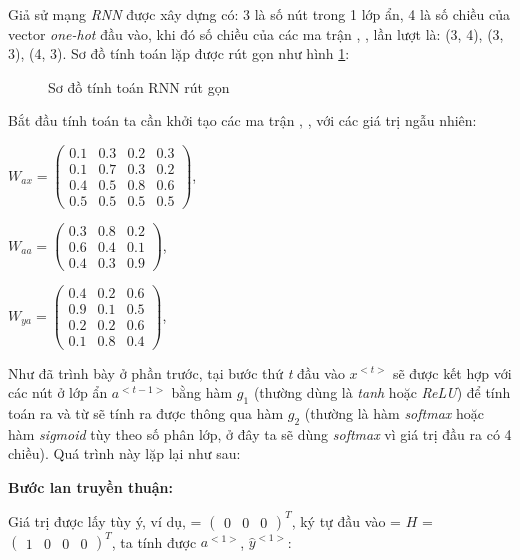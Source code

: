 Giả sử mạng \textit{RNN} được xây dựng có: 3 là số nút trong 1 lớp ẩn, 4 là số chiều của vector \textit{ one-hot} đầu vào, khi đó số chiều của các ma trận \wax, \waa, \wya \space lần lượt là: (3, 4), (3, 3), (4, 3). 
Sơ đồ tính toán lặp được rút gọn như hình \ref{folding}: 

\begin{figure}[H]
    \begin{center}
        
    \end{center}
    \caption{Sơ đồ tính toán RNN rút gọn}
    \label{folding} 
\end{figure}

Bắt đầu tính toán ta cần khởi tạo các ma trận \wax, \waa, \wya \space với các giá trị ngẫu nhiên:

$W_{ax} = 
\begin{pmatrix} 
0.1 & 0.3 & 0.2 & 0.3\\
0.1 & 0.7 & 0.3 & 0.2\\
0.4 & 0.5 & 0.8 & 0.6\\
0.5 & 0.5 & 0.5 & 0.5 
\end{pmatrix} $,

$W_{aa} = 
\begin{pmatrix} 
0.3 & 0.8 & 0.2 \\
0.6 & 0.4 & 0.1 \\
0.4 & 0.3 & 0.9 
\end{pmatrix} $,

$W_{ya} = 
\begin{pmatrix} 
0.4 & 0.2 & 0.6\\ 
0.9 & 0.1 & 0.5\\
0.2 & 0.2 & 0.6\\
0.1 & 0.8 & 0.4 
\end{pmatrix}$, 

Như đã trình bày ở phần trước, tại bước thứ \textit{t} đầu vào $x^{<t>}$ sẽ được kết hợp với các nút ở lớp ẩn $a^{<t-1>}$ bằng hàm $g_{1}$ (thường dùng là \textit{tanh} hoặc \textit{ReLU}) để tính toán ra  và từ  sẽ tính ra được  thông qua hàm $g_{2}$ (thường là hàm \textit{softmax} hoặc hàm \textit{sigmoid} tùy theo số phân lớp, ở đây ta sẽ dùng \textit{softmax} vì giá trị đầu ra  có 4 chiều). Quá trình này lặp lại như sau:

\textbf{Bước lan truyền thuận:}

Giá trị  được lấy tùy ý, ví dụ,  = $\begin{pmatrix} 0 & 0 & 0 \end{pmatrix} ^{T}$,  ký tự đầu vào  = $H$ =  $\begin{pmatrix} 1 & 0 & 0 & 0 \end{pmatrix} ^{T} $, ta tính được $a^{<1>}$, $\widehat{y}^{<1>}$:

